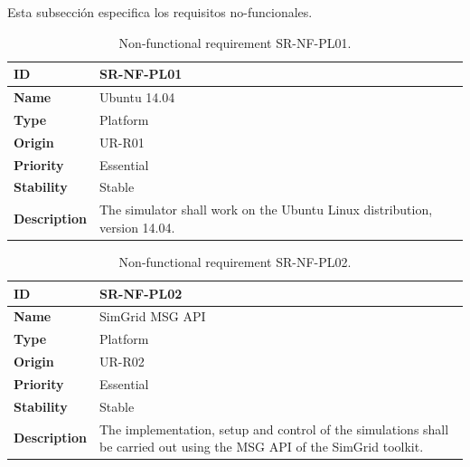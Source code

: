 Esta subsección especifica los requisitos no-funcionales.

\iffalse

\begin{center}
\begin{table}[htbp]
\centering
\begin{tabular}{@{}p{2.5cm} p{9cm}@{}} 
\toprule
\textbf{ID} 				& SR-NF-PL01\\
\midrule
\textbf{Name} 			& Ubuntu 14.04 \\
\midrule
\textbf{Type} 			& Platform \\
\midrule
\textbf{Origin} 			& UR-R01 \\
\midrule
\textbf{Priority}		& Essential \\
\midrule
\textbf{Stability} 		& Stable \\
\midrule
\textbf{Description} 	& The simulator shall work on the Ubuntu Linux distribution, version 14.04. \\
\bottomrule
\end{tabular}
\caption{Non-functional requirement SR-NF-PL01.}
\label{tab:srnfpl01}
\end{table}
\end{center}

\begin{center}
\begin{table}[htbp]
\centering
\begin{tabular}{@{}p{2.5cm} p{9cm}@{}} 
\toprule
\textbf{ID} 				& SR-NF-PL02\\
\midrule
\textbf{Name} 			& SimGrid MSG API \\
\midrule
\textbf{Type} 			& Platform \\
\midrule
\textbf{Origin} 			& UR-R02 \\
\midrule
\textbf{Priority}		& Essential \\
\midrule
\textbf{Stability} 		& Stable \\
\midrule
\textbf{Description} 	& The implementation, setup and control of the simulations shall be carried out using the MSG API of the SimGrid toolkit. \\
\bottomrule
\end{tabular}
\caption{Non-functional requirement SR-NF-PL02.}
\label{tab:srnfpl02}
\end{table}
\end{center}


